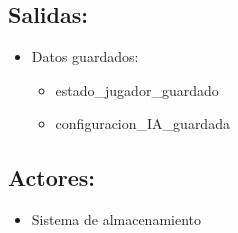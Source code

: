 \subsection*{Salidas:}
\begin{itemize}
    \item Datos guardados:
    \begin{itemize}
        \item estado\_jugador\_guardado
        \item configuracion\_IA\_guardada
    \end{itemize}
\end{itemize}

\subsection*{Actores:}
\begin{itemize}
    \item Sistema de almacenamiento
\end{itemize}


